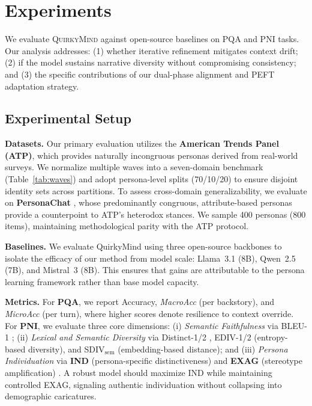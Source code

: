 \section{Experiments}\label{sec:exp}
We evaluate \textsc{QuirkyMind} against open-source baselines on PQA and PNI tasks. Our analysis addresses: (1) whether iterative refinement mitigates context drift; (2) if the model sustains narrative diversity without compromising consistency; and (3) the specific contributions of our dual-phase alignment and PEFT adaptation strategy.



\subsection{Experimental Setup}
\noindent \textbf{Datasets.}
Our primary evaluation utilizes the \textbf{American Trends Panel (ATP)}, which provides naturally incongruous personas derived from real-world surveys. We normalize multiple waves into a seven-domain benchmark (Table~\ref{tab:waves}) and adopt persona-level splits (70/10/20) to ensure disjoint identity sets across partitions. To assess cross-domain generalizability, we evaluate on \textbf{PersonaChat} \citep{zhang2018personachat}, whose predominantly congruous, attribute-based personas provide a counterpoint to ATP's heterodox stances. We sample 400 personas (800 items), maintaining methodological parity with the ATP protocol.



\noindent \textbf{Baselines.} 
We evaluate QuirkyMind using three open-source backbones to isolate the efficacy of our method from model scale: Llama~3.1 (8B), Qwen~2.5 (7B), and Mistral~3 (8B). This ensures that gains are attributable to the persona learning framework rather than base model capacity.



\noindent \textbf{Metrics.}
For \textbf{PQA}, we report Accuracy, \textit{MacroAcc} (per backstory), and \textit{MicroAcc} (per turn), where higher scores denote resilience to context override. For \textbf{PNI}, we evaluate three core dimensions: (i) \textit{Semantic Faithfulness} via BLEU-1 \citep{papineni-2002-bleu}; (ii) \textit{Lexical and Semantic Diversity} via Distinct-1/2 \citep{li-2016-diversity}, EDIV-1/2 (entropy-based diversity), and SDIV$_{\text{sem}}$ (embedding-based distance); and (iii) \textit{Persona Individuation} via \textbf{IND} (persona-specific distinctiveness) and \textbf{EXAG} (stereotype amplification) \citep{liu2024incongruous}. A robust model should maximize IND while maintaining controlled EXAG, signaling authentic individuation without collapsing into demographic caricatures.

